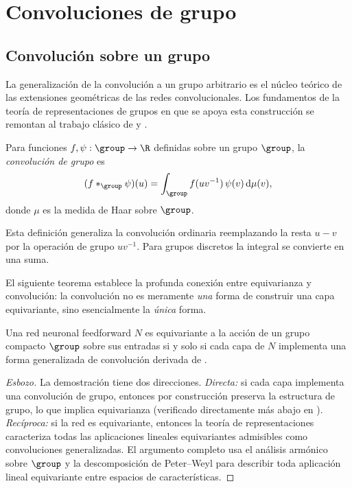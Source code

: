 \section{Convoluciones de grupo}
\label{sec:groups:convolutions}

\subsection{Convoluci\'on sobre un grupo}
\label{sec:groups:conv-on-group}

La generalizaci\'on de la convoluci\'on a un grupo arbitrario es el n\'ucleo
te\'orico de las extensiones geom\'etricas de las redes convolucionales. Los
fundamentos de la teor\'ia de representaciones de grupos en que se apoya esta
construcci\'on se remontan al trabajo cl\'asico de \citet{Peter1927} y
\citet{Serre1977}.

\begin{definition}
\label{def:groups:group-convolution}
Para funciones $f, \psi: \group \to \R$ definidas sobre un grupo $\group$, la
\emph{convoluci\'on de grupo} es
\begin{equation}
  (f *_{\group} \psi)(u)
  = \int_{\group} f(uv^{-1})\,\psi(v)\,\Haar(v),
  \label{eq:groups:group-convolution}
\end{equation}
donde $\mu$ es la medida de Haar sobre $\group$.
\end{definition}

Esta definici\'on generaliza la convoluci\'on ordinaria reemplazando la resta
$u - v$ por la operaci\'on de grupo $uv^{-1}$. Para grupos discretos la integral
se convierte en una suma.

El siguiente teorema establece la profunda conexi\'on entre equivarianza y
convoluci\'on: la convoluci\'on no es meramente \emph{una} forma de construir una
capa equivariante, sino esencialmente la \emph{\'unica} forma.

\begin{theorem}
\label{thm:groups:kondor-trivedi}
Una red neuronal feedforward $N$ es equivariante a la acci\'on de un grupo
compacto $\group$ sobre sus entradas si y solo si cada capa de $N$ implementa una
forma generalizada de convoluci\'on derivada de
\citep{kondor2018generalizationconvolutionalneural}.
\end{theorem}

\begin{proof}[Esbozo]
La demostraci\'on tiene dos direcciones. \emph{Directa:} si cada capa implementa
una convoluci\'on de grupo, entonces por construcci\'on preserva la estructura de
grupo, lo que implica equivarianza (verificado directamente m\'as abajo en
).
\emph{Rec\'iproca:} si la red es equivariante, entonces la teor\'ia de
representaciones caracteriza todas las aplicaciones lineales equivariantes
admisibles como convoluciones generalizadas. El argumento completo usa el
an\'alisis arm\'onico sobre $\group$ y la descomposici\'on de Peter--Weyl para
describir toda aplicaci\'on lineal equivariante entre espacios de
caracter\'isticas.
\end{proof}

